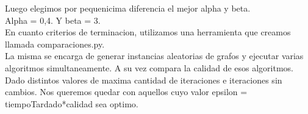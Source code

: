 \noindent 
Luego elegimos por pequenicima diferencia el mejor alpha y beta.  \\ 
Alpha = 0,4. Y beta = 3.  \\ 
\noindent 
En cuanto criterios de terminacion, utilizamos una herramienta que creamos llamada comparaciones.py.  \\ 
La misma se encarga de generar instancias aleatorias de grafos y ejecutar varias algoritmos simultaneamente. A su vez compara la calidad de esos algoritmos. 
Dado distintos valores de maxima cantidad de iteraciones e iteraciones sin cambios. Nos queremos quedar con aquellos cuyo valor epsilon = tiempoTardado*calidad sea optimo.
